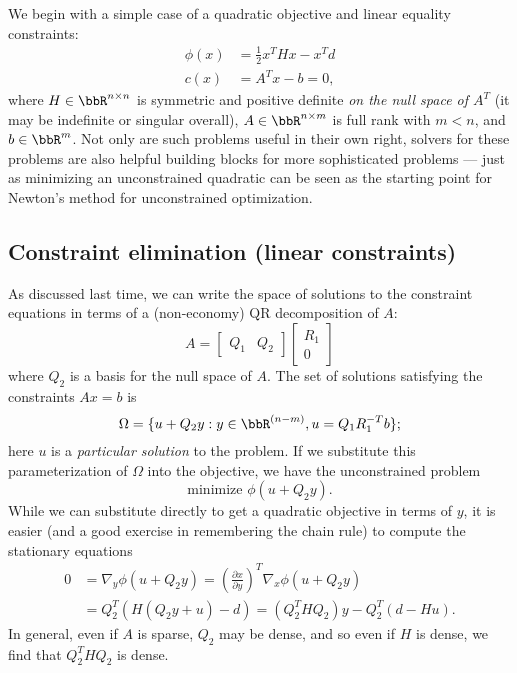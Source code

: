 \documentclass[12pt, leqno]{article} %
\begin{document}

We begin with a simple case of a quadratic objective and linear
equality constraints:
\begin{align*}
  \phi(x) &= \frac{1}{2} x^T H x - x^T d \\
  c(x) &= A^T x-b = 0,
\end{align*}
where $H \in \bbR^{n \times n}$ is symmetric and positive definite
{\em on the null space of $A^T$} (it may be indefinite or singular overall),
$A \in \bbR^{n \times m}$ is full rank with $m < n$, and $b \in \bbR^m$.
Not only are such problems useful in their own right, solvers for
these problems are also helpful building blocks for more sophisticated
problems --- just as minimizing an unconstrained quadratic can be seen
as the starting point for Newton's method for unconstrained optimization.

\subsection{Constraint elimination (linear constraints)}

As discussed last time, we can write the space of solutions to the
constraint equations in terms of a (non-economy) QR decomposition
of $A$:
\[
  A =
  \begin{bmatrix} Q_1 & Q_2 \end{bmatrix}
  \begin{bmatrix} R_1 \\ 0 \end{bmatrix}
\]
where $Q_2$ is a basis for the null space of $A$.  The set of
solutions satisfying the constraints $Ax = b$ is
\[
  \Omega = \{ u + Q_2 y : y \in \bbR^{(n-m)}, u = Q_1 R_1^{-T} b \};
\]
here $u$ is a {\em particular solution} to the problem.  If we
substitute this parameterization of $\Omega$ into the objective,
we have the unconstrained problem
\[
  \mbox{minimize } \phi(u + Q_2 y).
\]
While we can substitute directly to get a quadratic objective in
terms of $y$, it is easier (and a good exercise in remembering
the chain rule) to compute the stationary equations
\begin{align*}
  0
  &= \nabla_y \phi(u + Q_2 y) 
  = \left(\frac{\partial x}{\partial y}\right)^T \nabla_x \phi(u+Q_2 y) \\
  &= Q_2^T (H (Q_2 y + u) - d) 
  = (Q_2^T H Q_2) y - Q_2^T (d-Hu).
\end{align*}
In general, even if $A$ is sparse, $Q_2$ may be dense, and so even if
$H$ is dense, we find that $Q_2^T H Q_2$ is dense.
\end{document}
